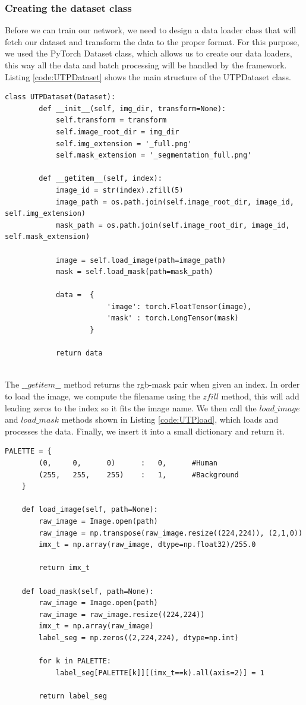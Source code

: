 \subsubsection{Creating the dataset class}
Before we can train our network, we need to design a data loader class that will fetch our dataset and transform the data to the proper format. For this purpose, we used the PyTorch Dataset class, which allows us to create our data loaders, this way all the data and batch processing will be handled by the framework. Listing \ref{code:UTPDataset} shows the main structure of the UTPDataset class.

\begin{lstlisting}[style=Python-color, caption=UTPDataset definition, frame=single, label=code:UTPDataset]
	class UTPDataset(Dataset):
		def __init__(self, img_dir, transform=None):
			self.transform = transform
			self.image_root_dir = img_dir
			self.img_extension = '_full.png'
			self.mask_extension = '_segmentation_full.png'
			
		def __getitem__(self, index):
			image_id = str(index).zfill(5)
			image_path = os.path.join(self.image_root_dir, image_id, self.img_extension)
			mask_path = os.path.join(self.image_root_dir, image_id, self.mask_extension)
			
			image = self.load_image(path=image_path)
			mask = self.load_mask(path=mask_path)
			
			data =  {
						'image': torch.FloatTensor(image),
						'mask' : torch.LongTensor(mask)
					}
					
			return data
			
\end{lstlisting}

The \textbf{$\_\_getitem\_\_$} method returns the rgb-mask pair when given an index. In order to load the image, we compute the filename using the $zfill$ method, this will add leading zeros to the index so it fits the image name. We then call the $load\_image$ and $load\_mask$ methods shown in Listing \ref{code:UTPload}, which loads and processes the data. Finally, we insert it into a small dictionary and return it.

\begin{lstlisting}[style=Python-color, caption=UTPDataset rgb and mask load and pre-processing, frame=single, label=code:UTPload]
	PALETTE = {
		(0,		0,		0)		:	0,		#Human
		(255,	255,	255)	:	1,		#Background
	}

	def load_image(self, path=None):
		raw_image = Image.open(path)
		raw_image = np.transpose(raw_image.resize((224,224)), (2,1,0))
		imx_t = np.array(raw_image, dtype=np.float32)/255.0
		
		return imx_t

	def load_mask(self, path=None):
		raw_image = Image.open(path)
		raw_image = raw_image.resize((224,224))
		imx_t = np.array(raw_image)
		label_seg = np.zeros((2,224,224), dtype=np.int)
		
		for k in PALETTE:
			label_seg[PALETTE[k]][(imx_t==k).all(axis=2)] = 1
		
		return label_seg
		
\end{lstlisting}

